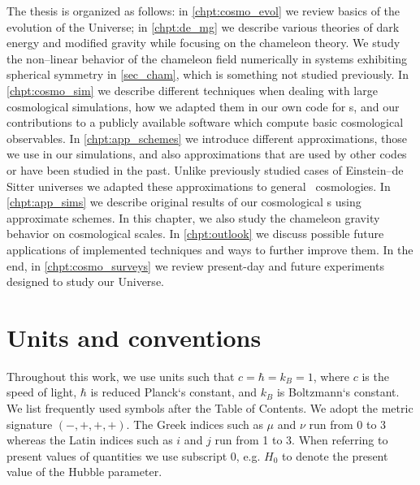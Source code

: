 The thesis is organized as follows: in \autoref{chpt:cosmo_evol} we review basics of the evolution of the Universe; in \autoref{chpt:de_mg} we describe various theories of dark energy and modified gravity while focusing on the chameleon theory. We study the non--linear behavior of the chameleon field numerically in systems exhibiting spherical symmetry in \autoref{sec_cham}, which is something not studied previously. In \autoref{chpt:cosmo_sim} we describe different techniques when dealing with large cosmological simulations, how we adapted them in our own code for \nbodysim s, and our contributions to a publicly available software  which compute basic cosmological observables. In \autoref{chpt:app_schemes} we introduce different approximations, those we use in our simulations, and also approximations that are used by other codes or have been studied in the past. Unlike previously studied cases of Einstein--de Sitter universes we adapted these approximations to general \LCDM\ cosmologies. In \autoref{chpt:app_sims} we describe original results of our cosmological \nbodysim s using approximate schemes. In this chapter, we also study the chameleon gravity behavior on cosmological scales. In \autoref{chpt:outlook} we discuss possible future applications of implemented techniques and ways to further improve them. In the end, in \autoref{chpt:cosmo_surveys} we review present-day and future experiments designed to study our Universe.

\section*{Units and conventions}
Throughout this work, we use units such that $c=\hbar=k_B=1$, where $c$ is the speed of light, $\hbar$ is reduced Planck`s constant, and $k_B$ is Boltzmann`s constant. We list frequently used symbols after the Table of Contents. We adopt the metric signature $(-, +, +, +)$. The Greek indices such as $\mu$ and $\nu$ run from 0 to 3 whereas the Latin indices such as $i$ and $j$ run from 1 to 3. When referring to present values of quantities we use subscript $0$, e.g. $H_0$ to denote the present value of the Hubble parameter.
